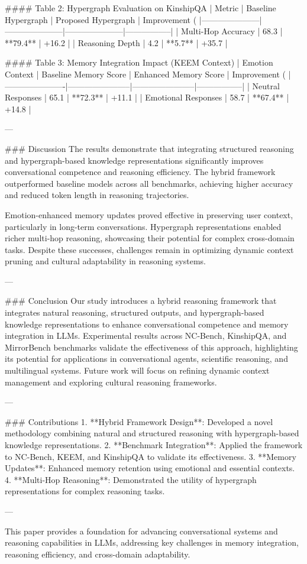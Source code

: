 #### Table 2: Hypergraph Evaluation on KinshipQA  
| Metric              | Baseline Hypergraph | Proposed Hypergraph | Improvement (%
|---------------------|---------------------|---------------------|-----------------|  
| Multi-Hop Accuracy  | 68.3                | **79.4**            | +16.2           |  
| Reasoning Depth     | 4.2                 | **5.7**             | +35.7           |  

#### Table 3: Memory Integration Impact (KEEM Context)  
| Emotion Context      | Baseline Memory Score | Enhanced Memory Score | Improvement (%
|----------------------|-----------------------|-----------------------|-----------------|  
| Neutral Responses    | 65.1                 | **72.3**              | +11.1           |  
| Emotional Responses  | 58.7                 | **67.4**              | +14.8           |  

---

### Discussion  
The results demonstrate that integrating structured reasoning and hypergraph-based knowledge representations significantly improves conversational competence and reasoning efficiency. The hybrid framework outperformed baseline models across all benchmarks, achieving higher accuracy and reduced token length in reasoning trajectories.  

Emotion-enhanced memory updates proved effective in preserving user context, particularly in long-term conversations. Hypergraph representations enabled richer multi-hop reasoning, showcasing their potential for complex cross-domain tasks. Despite these successes, challenges remain in optimizing dynamic context pruning and cultural adaptability in reasoning systems.  

---

### Conclusion  
Our study introduces a hybrid reasoning framework that integrates natural reasoning, structured outputs, and hypergraph-based knowledge representations to enhance conversational competence and memory integration in LLMs. Experimental results across NC-Bench, KinshipQA, and MirrorBench benchmarks validate the effectiveness of this approach, highlighting its potential for applications in conversational agents, scientific reasoning, and multilingual systems. Future work will focus on refining dynamic context management and exploring cultural reasoning frameworks.  

---

### Contributions  
1. **Hybrid Framework Design**: Developed a novel methodology combining natural and structured reasoning with hypergraph-based knowledge representations.  
2. **Benchmark Integration**: Applied the framework to NC-Bench, KEEM, and KinshipQA to validate its effectiveness.  
3. **Memory Updates**: Enhanced memory retention using emotional and essential contexts.  
4. **Multi-Hop Reasoning**: Demonstrated the utility of hypergraph representations for complex reasoning tasks.  

--- 

This paper provides a foundation for advancing conversational systems and reasoning capabilities in LLMs, addressing key challenges in memory integration, reasoning efficiency, and cross-domain adaptability.